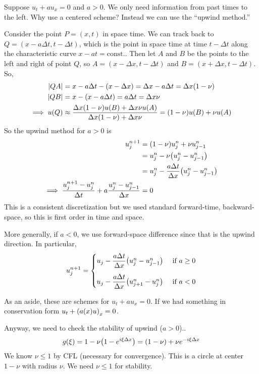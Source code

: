 \documentclass{article}
\newcommand{\Dx}{\Delta x}
\newcommand{\Dt}{\Delta t}
\begin{document}
        Suppose $u_t + au_x = 0$ and $a > 0$.  We only need information from past times to the left.  Why use a centered scheme?  Instead we can use the ``upwind method.''

        Consider the point $P = (x,t)$ in space time.  We can track back to $Q = (x - a\Dt, t - \Dt)$, which is the point in space time at time $t - \Dt$ along the characteristic curve $x - at = \text{const.}$.  Then let $A$ and $B$ be the points to the left and right of point $Q$, so $A = (x - \Dx, t - \Dt)$ and $B = (x + \Dx, t- \Dt)$.  So,
        \begin{align*}
            \abs{QA} &= x - a\Dt - \qty(x - \Dx) = \Dx - a\Dt = \Dx(1 - \nu) \\
            \abs{QB} &= x - (x - a\Dt) = a\Dt = \Dx\nu \\
            \implies u(Q) &\approx \frac{\Dx\qty(1 - \nu)u(B) + \Dx\nu u(A)}{\Dx\qty(1 - \nu) + \Dx\nu} = \qty(1 - \nu)u(B) + \nu u(A)
        \end{align*}
        So the upwind method for $a > 0$ is
        \begin{align*}
            u_j^{n+1} &= \qty(1 - \nu)u_j^n + \nu u_{j-1}^n \\
            &= u_j^n - \nu\qty(u_j^n - u_{j-1}^n) \\
            &= u_j^n - \frac{a\Dt}{\Dx}\qty(u_j^n - u_{j-1}^n) \\
            \implies \frac{u_j^{n+1} - u_j^n}{\Dt} + a\frac{u_j^n - u_{j-1}^n}{\Dx} &= 0
        \end{align*}
        This is a consistent discretization but we used standard forward-time, backward-space, so this is first order in time and space.

        More generally, if $a < 0$, we use forward-space difference since that is the upwind direction.  In particular,
        \begin{align*}
            u_j^{n+1} = \begin{cases}
                u_j - \dfrac{a\Dt}{\Dx}\qty(u_j^n - u_{j-1}^n) & \text{ if } a \geq 0 \\[.4cm]
                u_j - \dfrac{a\Dt}{\Dx}\qty(u_{j+1}^n - u_j^n) & \text{ if } a < 0
            \end{cases}
        \end{align*}

        As an aside, these are schemes for $u_t + au_x = 0$.  If we had something in conservation form $u_t + \qty(a(x)u)_x = 0$.

        Anyway, we need to check the stability of upwind ($a > 0$)..
        \begin{align*}
            g(\xi) = 1 - \nu\qty(1 - e^{i\xi\Dx}) = \qty(1 - \nu) + \nu e^{-i\xi\Dx}
        \end{align*}
        We know $\nu \leq 1$ by CFL (necessary for convergence).  This is a circle at center $1 - \nu$ with radius $\nu$.  We need $\nu \leq 1$ for stability.
\end{document}
